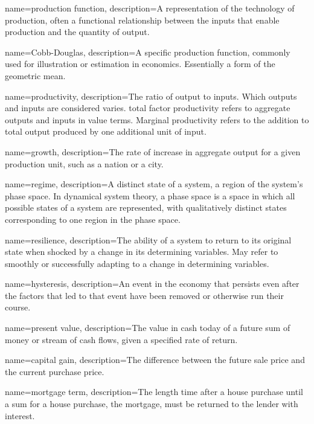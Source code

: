 {
name=production function,
description={A representation of the technology of production, often a functional relationship between the \glspl{input} that enable production and the quantity of \gls{output}.}
}

{
name=Cobb-Douglas,
description={A specific production function, commonly used for illustration or estimation in economics. Essentially a form of the geometric mean.}
}

{
name=productivity,
description={The ratio of \gls{output} to \glspl{input}. Which outputs and inputs are considered varies. \gls{total factor productivity} refers to aggregate outputs and inputs in value terms. Marginal productivity refers to the addition to total output produced by one additional unit of input.} 
}

{
name=growth,
description={The rate of increase in aggregate \gls{output} for a given production unit, such as a nation  or a city.}
}

{
name=regime,
description={A distinct state of a system, a region of the system's phase space. In dynamical system theory, a phase space is a space in which all possible states of a system are represented, with qualitatively distinct  states corresponding to one region in the phase space.}
}

{
name=resilience,
description={The ability of a system to return to its original state when shocked by a change in its determining variables. May refer to smoothly or successfully adapting to a change in  determining variables.}
}

{
name=hysteresis,
description={An event in the economy that persists even after the factors that led to that event have been removed or otherwise run their course.}
}

{
name=present value,
description={The value in cash today of a future sum of money or stream of cash flows, given a specified rate of return.}
}

{
name=capital gain,
description={The difference between the future sale price and the current purchase price.}
}

{
name=mortgage term,
description={The length time after a house purchase until a sum for a house purchase, the mortgage, must be returned to the lender with interest.}
}

